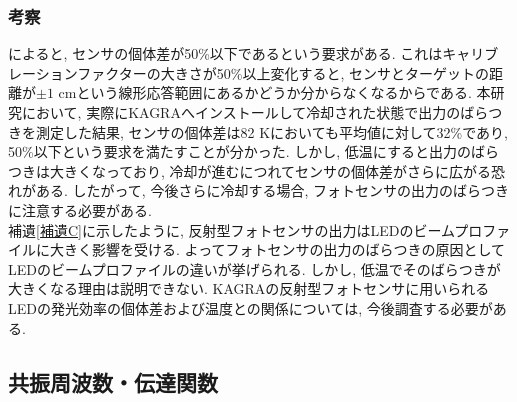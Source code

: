\subsubsection{考察}
\vskip3mm
\cite{47}によると, センサの個体差が50\%以下であるという要求がある. これはキャリブレーションファクターの大きさが50\%以上変化すると, センサとターゲットの距離が$\pm 1$ cmという線形応答範囲にあるかどうか分からなくなるからである. 本研究において, 実際にKAGRAへインストールして冷却された状態で出力のばらつきを測定した結果, センサの個体差は82 Kにおいても平均値に対して32\%であり, 50\%以下という要求を満たすことが分かった. しかし, 低温にすると出力のばらつきは大きくなっており, 冷却が進むにつれてセンサの個体差がさらに広がる恐れがある. したがって, 今後さらに冷却する場合, フォトセンサの出力のばらつきに注意する必要がある.\\
\quad 補遺\ref{補遺C}に示したように, 反射型フォトセンサの出力はLEDのビームプロファイルに大きく影響を受ける. よってフォトセンサの出力のばらつきの原因としてLEDのビームプロファイルの違いが挙げられる. しかし, 低温でそのばらつきが大きくなる理由は説明できない. KAGRAの反射型フォトセンサに用いられるLEDの発光効率の個体差および温度との関係については, 今後調査する必要がある.

\subsection{共振周波数・伝達関数}
